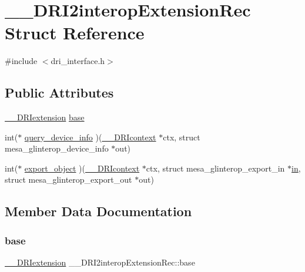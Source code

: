 \hypertarget{struct_____d_r_i2interop_extension_rec}{}\section{\+\_\+\+\_\+\+D\+R\+I2interop\+Extension\+Rec Struct Reference}
\label{struct_____d_r_i2interop_extension_rec}


{\ttfamily \#include $<$dri\+\_\+interface.\+h$>$}

\subsection*{Public Attributes}
\begin{DoxyCompactItemize}
\item 
\hyperlink{dri__interface_8h_a4e0a61c8ece00d2b2c6792a9a1b55385}{\+\_\+\+\_\+\+D\+R\+Iextension} \hyperlink{struct_____d_r_i2interop_extension_rec_af2fafd0b6898b7a61c6e2bb5629c7c06}{base}
\item 
int($\ast$ \hyperlink{struct_____d_r_i2interop_extension_rec_a68eb8ce4cad172f09ddcc523d363ac19}{query\+\_\+device\+\_\+info} )(\hyperlink{dri__interface_8h_a3fd295cba82b5a3d79f1ee7e12bfb908}{\+\_\+\+\_\+\+D\+R\+Icontext} $\ast$ctx, struct mesa\+\_\+glinterop\+\_\+device\+\_\+info $\ast$out)
\item 
int($\ast$ \hyperlink{struct_____d_r_i2interop_extension_rec_aeed8c19fe5e28bb472baef24bc076bb8}{export\+\_\+object} )(\hyperlink{dri__interface_8h_a3fd295cba82b5a3d79f1ee7e12bfb908}{\+\_\+\+\_\+\+D\+R\+Icontext} $\ast$ctx, struct mesa\+\_\+glinterop\+\_\+export\+\_\+in $\ast$\hyperlink{glext_8h_a83ad0ee7f1e06b59c90271716e689080}{in}, struct mesa\+\_\+glinterop\+\_\+export\+\_\+out $\ast$out)
\end{DoxyCompactItemize}


\subsection{Member Data Documentation}
\mbox{\label{struct_____d_r_i2interop_extension_rec_af2fafd0b6898b7a61c6e2bb5629c7c06}} 
\subsubsection{\texorpdfstring{base}{base}}
{\footnotesize\ttfamily \hyperlink{dri__interface_8h_a4e0a61c8ece00d2b2c6792a9a1b55385}{\+\_\+\+\_\+\+D\+R\+Iextension} \+\_\+\+\_\+\+D\+R\+I2interop\+Extension\+Rec\+::base}

